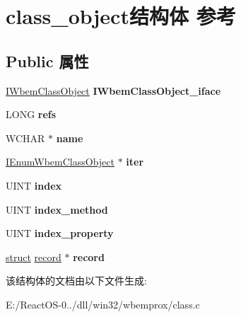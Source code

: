 \hypertarget{structclass__object}{}\section{class\+\_\+object结构体 参考}
\label{structclass__object}
\subsection*{Public 属性}
\begin{DoxyCompactItemize}
\item 
\mbox{\label{structclass__object_ac129380010770d0b8edf8d2e7534d84a}} 
\hyperlink{interface_i_wbem_class_object}{I\+Wbem\+Class\+Object} {\bfseries I\+Wbem\+Class\+Object\+\_\+iface}
\item 
\mbox{\label{structclass__object_aeb978de76da8201c040e4db919963d9d}} 
L\+O\+NG {\bfseries refs}
\item 
\mbox{\label{structclass__object_a66737b497387ef2592f024c0baf05bd5}} 
W\+C\+H\+AR $\ast$ {\bfseries name}
\item 
\mbox{\label{structclass__object_a1abc45fde141949d26c531320184e92c}} 
\hyperlink{interface_i_enum_wbem_class_object}{I\+Enum\+Wbem\+Class\+Object} $\ast$ {\bfseries iter}
\item 
\mbox{\label{structclass__object_ac8d9aa82f0e90ed5bc685d29bc2774f2}} 
U\+I\+NT {\bfseries index}
\item 
\mbox{\label{structclass__object_a5a88e87db21d2644833c12bd74c822e5}} 
U\+I\+NT {\bfseries index\+\_\+method}
\item 
\mbox{\label{structclass__object_a811791c9d149f8ad629a039153c2db71}} 
U\+I\+NT {\bfseries index\+\_\+property}
\item 
\mbox{\label{structclass__object_aabb96039469debc65b0f274f0f67c1ec}} 
\hyperlink{interfacestruct}{struct} \hyperlink{structrecord}{record} $\ast$ {\bfseries record}
\end{DoxyCompactItemize}


该结构体的文档由以下文件生成\+:\begin{DoxyCompactItemize}
\item 
E\+:/\+React\+O\+S-\/0../dll/win32/wbemprox/class.\+c\end{DoxyCompactItemize}
